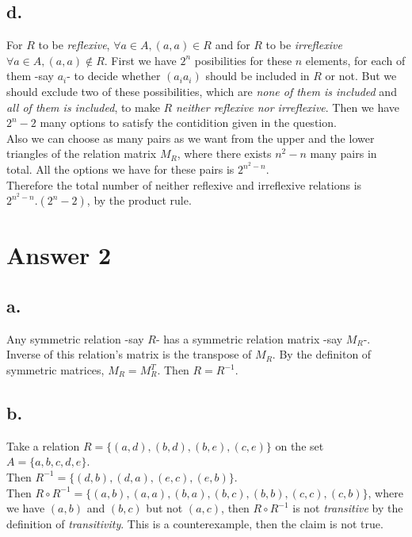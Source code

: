\documentclass[12pt]{article}
\begin{document}
\subsection*{d.}

For $R$ to be \textit{reflexive}, $\forall a\in A, (a, a)\in R$ and for $R$ to be \textit{irreflexive} $\forall a\in A, (a, a)\notin R$. First we have $2^n$ posibilities for these $n$ elements, for each of them -say $a_i$- to decide whether $(a_i a_i)$ should be included in $R$ or not. But we should exclude two of these possibilities, which are \textit{none of them is included} and \textit{all of them is included}, to make $R$ \textit{neither reflexive nor irreflexive}. Then we have $2^n-2$ many options to satisfy the contidition given in the question.\\

Also we can choose as many pairs as we want from the upper and the lower triangles of the relation matrix $M_R$, where there exists $n^2-n$ many pairs in total. All the options we have for these pairs is $2^{n^2-n}$.\\

Therefore the total number of neither reflexive and irreflexive relations is $2^{n^2-n}.(2^n-2)$, by the product rule.

\section*{Answer 2}

\subsection*{a.}

Any symmetric relation -say $R$- has a symmetric relation matrix -say $M_R$-. Inverse of this relation's matrix is the transpose of $M_R$. By the definiton of symmetric matrices, $M_R=M_R^T$. Then $R=R^{-1}$.

\subsection*{b.}

Take a relation $R=\{(a,d),(b,d),(b,e),(c,e)\}$ on the set $A=\{a,b,c,d,e\}$.\\
Then $R^{-1}=\{(d,b),(d,a),(e,c),(e,b)\}$.\\
Then $R \circ R^{-1}=\{(a,b),(a,a),(b,a),(b,c),(b,b),(c,c),(c,b)\}$, where we have $(a, b)$ and $(b, c)$ but not $(a ,c)$, then $R\circ R^{-1}$ is not \textit{transitive} by the definition of \textit{transitivity}. This is a counterexample, then the claim is not true.
\end{document}
